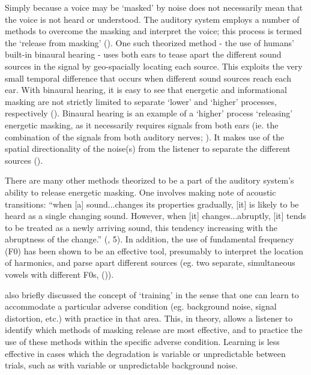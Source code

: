 Simply because a voice may be `masked' by noise does not necessarily mean that the voice is not heard or understood.  The auditory system employs a number of methods to overcome the masking and interpret the voice; this process is termed the `release from masking' (\cite{middlebrooks:17}).  One such theorized method - the use of humans' built-in binaural hearing - uses both ears to tease apart the different sound sources in the signal by geo-spacially locating each source.  This exploits the very small temporal difference that occurs when different sound sources reach each ear.  
With binaural hearing, it is easy to see that energetic and informational masking are not strictly limited to separate `lower' and `higher' processes, respectively (\cite{durlach:06}).
Binaural hearing is an example of a `higher' process `releasing' energetic masking, as it necessarily requires signals from both ears (ie. the combination of the signals from both auditory nerves; \cite{hirsh:48}). It makes use of the spatial directionality of the noise(s) from the listener to separate the different sources (\cite{bregman:94}).

There are many other methods theorized to be a part of the auditory system's ability to release energetic masking.  One involves making note of acoustic transitions: ``when [a] sound...changes its properties gradually, [it] is likely to be heard as a single changing sound.  However, when [it] changes...abruptly, [it] tends to be treated as a newly arriving sound, this tendency increasing with the abruptness of the change.'' (\cite{bregman:94}, 5).  In addition, the use of fundamental frequency (F0) has been shown to be an effective tool, presumably to interpret the location of harmonics, and parse apart different sources (eg. two separate, simultaneous vowels with different F0s, (\cite{bird:97})). %

\cite{mattys:12} also briefly discussed the concept of `training' in the sense that one can learn to accommodate a particular adverse condition (eg. background noise, signal distortion, etc.) with practice in that area.  This, in theory, allows a listener to identify which methods of masking release are most effective, and to practice the use of these methods within the specific adverse condition.  Learning is less effective in cases which the degradation is variable or unpredictable between trials, such as with variable or unpredictable background noise.


